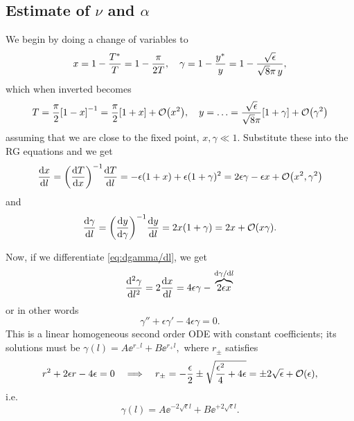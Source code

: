 \documentclass[11pt,letter, swedish, english
]{article}
\begin{document}
\subsection{Estimate of $\nu$ and $\alpha$}
We begin by doing a change of variables to
\begin{equation}
x = 1-\frac{T^*}{T} = 1-\frac{\pi}{2T}\qcomma
\gamma = 1-\frac{y^*}{y} = 1-\frac{\sqrt{\epsilon}}{\sqrt{8}\pi\,y},
\end{equation}
which when inverted becomes
\begin{equation}
T=\frac{\pi}{2}\qty[1-x]^{-1} = \frac{\pi}{2}\qty[1+x] +\order{x^2}
\qcomma
y = \ldots = \frac{\sqrt{\epsilon}}{\sqrt{8}\pi}\qty[1+\gamma] 
+\order{\gamma^2}
\end{equation}
assuming that we are close to the fixed point, $x,\gamma\ll1$.
Substitute these into the RG equations and we get
\begin{equation}\label{eq:dx/dl}
\dv{x}{l} = \qty(\dv{T}{x})^{-1}\dv{T}{l} 
= -\epsilon(1+x) + \epsilon(1+\gamma)^2
= 2\epsilon\gamma -\epsilon x +\order{x^2, \gamma^2}
\end{equation}
and
\begin{equation}\label{eq:dgamma/dl}
\dv{\gamma}{l} = \qty(\dv{y}{\gamma})^{-1}\dv{y}{l}
=2x(1+\gamma) = 2x + \order{x\gamma}.
\end{equation}

Now, if we differentiate \eqref{eq:dgamma/dl}, we get
\begin{equation}
\dv[2]{\gamma}{l} = 2\dv{x}{l} = 4\epsilon\gamma 
- \overbrace{2\epsilon x}^{\dv*{\gamma}{l}}
\end{equation}
or in other words
\begin{equation}
\gamma'' +\epsilon\gamma' -4\epsilon\gamma = 0.
\end{equation}
This is a linear homogeneous second order ODE with constant
coefficients; its solutions must be
$ %
\gamma(l) = A\ee^{r_-l} + B\ee^{r_+l},
$ %
where $r_\pm$ satisfies
\begin{equation}
r^2 +2\epsilon r -4\epsilon = 0
\quad\Longrightarrow\quad
r_\pm = -\frac{\epsilon}{2} 
\pm\sqrt{\frac{\epsilon^2}{4} + 4\epsilon}
=\pm2\sqrt{\epsilon} + \order{\epsilon},
\end{equation}
i.e.
\begin{equation}
\gamma(l) = A\ee^{-2\sqrt{\epsilon}l} + B\ee^{+2\sqrt{\epsilon}l}.
\end{equation}
\end{document}
